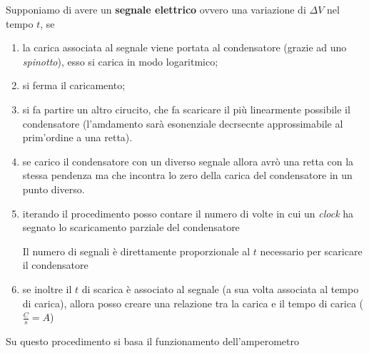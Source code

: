 \documentclass{article}
\begin{document}
Supponiamo di avere un \textbf{segnale elettrico} ovvero una variazione di $\Delta V$ nel tempo $t$, se
\begin{enumerate}
  \item la carica associata al segnale viene portata al condensatore (grazie ad uno \textit{spinotto}), esso si carica in modo logaritmico;
  \item  si ferma il caricamento;
  \item  si fa partire un altro cirucito, che fa scaricare il più linearmente possibile il condensatore (l'amdamento sarà esonenziale decrsecnte approssimabile al prim'ordine a una retta).
  \item se carico il condensatore con un diverso segnale allora avrò una retta con la stessa pendenza ma che incontra lo zero della carica del condensatore in un punto diverso.
  \item iterando il procedimento posso contare il numero di volte in cui un \textit{clock} ha segnato lo scaricamento parziale del condensatore
  
  Il numero di segnali è direttamente proporzionale al $t$ necessario per scaricare il condensatore
  \item se inoltre il $t$ di scarica è associato al segnale (a sua volta associata al tempo di carica), allora posso creare una relazione tra la carica e il tempo di carica ($\frac{C}{s}=A$)
\end{enumerate}
Su questo procedimento si basa il funzionamento dell'amperometro
\end{document}
